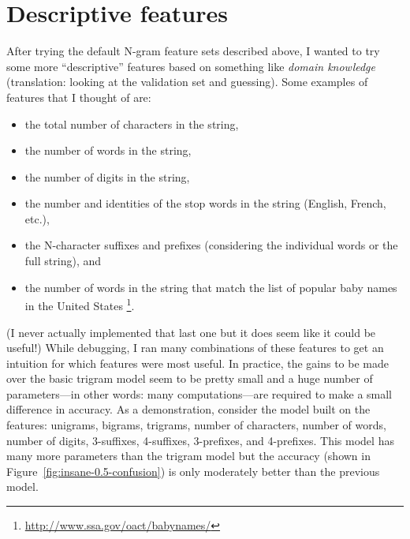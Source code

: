 \documentclass[11pt]{article}
\newcommand{\fig}[1]{Figure~\ref{fig:#1}}
\begin{document}
\clearpage

\section{Descriptive features}

After trying the default N-gram feature sets described above, I wanted to try
some more ``descriptive'' features based on something like \emph{domain
knowledge} (translation: looking at the validation set and guessing).
Some examples of features that I thought of are:
\begin{itemize}
\item{the total number of characters in the string,}
\item{the number of words in the string,}
\item{the number of digits in the string,}
\item{the number and identities of the stop words in the string (English,
      French, etc.),}
\item{the N-character suffixes and prefixes (considering the individual
      words or the full string), and}
\item{the number of words in the string that match the list of popular baby
      names in the United States%
\footnote{\url{http://www.ssa.gov/oact/babynames/}}.}
\end{itemize}
(I never actually implemented that last one but it does seem like it could be
useful!)
While debugging, I ran many combinations of these features to get an intuition
for which features were most useful.
In practice, the gains to be made over the basic trigram model seem to be
pretty small and a huge number of parameters---in other words: many
computations---are required to make a small difference in accuracy.
As a demonstration, consider the model built on the features: unigrams,
bigrams, trigrams, number of characters, number of words, number of digits,
3-suffixes, 4-suffixes, 3-prefixes, and 4-prefixes.
This model has many more parameters than the trigram model but the accuracy
(shown in \fig{insane-0.5-confusion}) is only moderately better than the
previous model.
\end{document}
